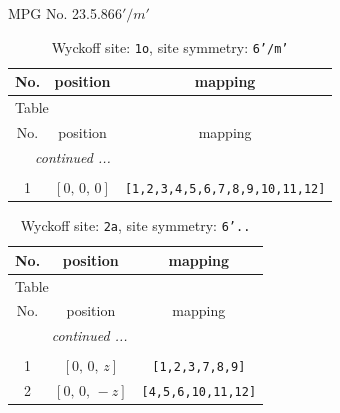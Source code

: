 \documentclass[fleqn,8pt]{jsarticle}
\begin{document}
\setcounter{MaxMatrixCols}{32}

\renewcommand{\tablename}{Table~}
\renewcommand{\figurename}{Figure~}
\begin{center}
\LARGE
MPG No. 23.5.86\quad$6'/m'$
\end{center}
\renewcommand{\arraystretch}{1.2}
\begin{longtable}{ccc}
\caption{Wyckoff site: {\tt 1o}, site symmetry: {\tt 6'/m'}}
 \\
 \hline \hline
No. & position & mapping \\ \hline \endfirsthead

\multicolumn{2}{l}{\tablename\ \thetable{}} \\
 \hline \hline
No. & position & mapping \\ \hline \endhead

 \hline \hline
\multicolumn{2}{r}{\footnotesize\it continued ...} \\ \endfoot

 \hline \hline
\multicolumn{2}{r}{} \\ \endlastfoot

1 & $\left[ 0,\, 0,\, 0 \right]$ & {\tt [1,2,3,4,5,6,7,8,9,10,11,12]} \\
\end{longtable}
\renewcommand{\arraystretch}{1.2}
\begin{longtable}{ccc}
\caption{Wyckoff site: {\tt 2a}, site symmetry: {\tt 6'..}}
 \\
 \hline \hline
No. & position & mapping \\ \hline \endfirsthead

\multicolumn{2}{l}{\tablename\ \thetable{}} \\
 \hline \hline
No. & position & mapping \\ \hline \endhead

 \hline \hline
\multicolumn{2}{r}{\footnotesize\it continued ...} \\ \endfoot

 \hline \hline
\multicolumn{2}{r}{} \\ \endlastfoot

1 & $\left[ 0,\, 0,\, z \right]$ & {\tt [1,2,3,7,8,9]} \\ \hline
2 & $\left[ 0,\, 0,\, - z \right]$ & {\tt [4,5,6,10,11,12]} \\
\end{longtable}
\renewcommand{\arraystretch}{1.2}
\end{document}
